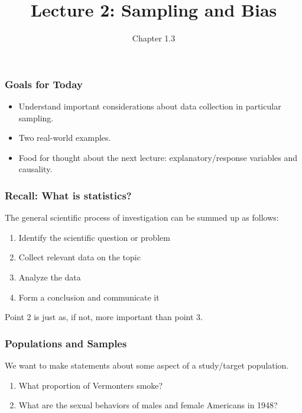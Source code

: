 \documentclass[slides]{beamer}
\title{Lecture 2: Sampling and Bias}
\author{Chapter 1.3}
\date{}
\newcommand{\blue}[1]{\textcolor{blue2}{#1}}
\begin{document}
\begin{frame}
\titlepage
\end{frame}


\begin{frame}
\frametitle{Goals for Today}
\begin{itemize}
  \item Understand important considerations about data collection in particular \blue{sampling}.
  \item Two real-world examples.
  \item Food for thought about the next lecture: explanatory/response variables and causality.  
\end{itemize}

\end{frame}


\begin{frame}
\frametitle{Recall:  What is statistics?}

The general scientific process of investigation can be summed up as follows:

\begin{enumerate}
\item Identify the scientific question or problem
\item Collect relevant data on the topic
\item Analyze the data
\item Form a conclusion and communicate it
\end{enumerate}

\pause Point 2 is just as, if not, more important than point 3.

\end{frame}


\begin{frame}
\frametitle{Populations and Samples}
We want to make statements about some aspect of a \blue{study/target population}.  

\begin{enumerate}
\item What proportion of Vermonters smoke?
\item What are the sexual behaviors of males and female Americans in 1948?
\end{enumerate}

\end{frame}
\end{document}
